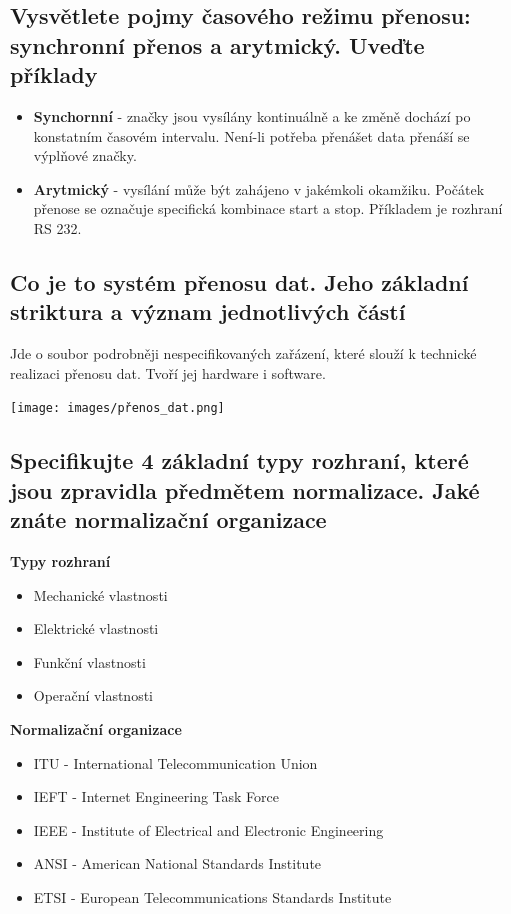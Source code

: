 \subsection{Vysvětlete pojmy časového režimu přenosu: synchronní přenos a arytmický. Uveďte příklady}
\begin{itemize}
    \item  \textbf{ Synchornní} - značky jsou vysílány kontinuálně a ke změně dochází po konstatním časovém intervalu.
    Není-li potřeba přenášet data přenáší se výplňové značky.
    \item \textbf{Arytmický} - vysílání může být zahájeno v jakémkoli okamžiku. 
    Počátek přenose se označuje specifická kombinace start a stop. Příkladem je rozhraní RS 232.
    
\end{itemize}

\subsection{Co je to systém přenosu dat. Jeho základní striktura a význam jednotlivých částí}
Jde o soubor podrobněji nespecifikovaných zařázení, které slouží k technické realizaci přenosu dat.
Tvoří jej hardware i software.

\texttt{[image: images/přenos\_dat.png]}

\subsection{Specifikujte  4 základní typy rozhraní, které jsou zpravidla předmětem normalizace. Jaké znáte normalizační organizace}
\textbf{Typy rozhraní}
\begin{itemize}
    \item Mechanické vlastnosti
    \item Elektrické vlastnosti
    \item Funkční vlastnosti
    \item Operační vlastnosti
\end{itemize}
\textbf{Normalizační organizace}
\begin{itemize}
    \item ITU - International Telecommunication Union
     \item IEFT - Internet Engineering Task Force
     \item IEEE - Institute of Electrical and Electronic Engineering
     \item ANSI - American National Standards Institute
     \item ETSI - European Telecommunications Standards Institute
\end{itemize}

